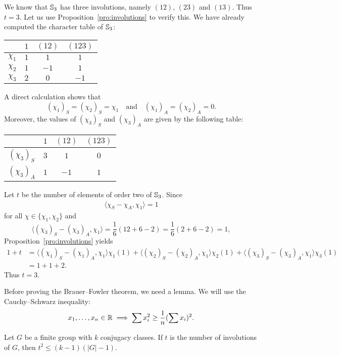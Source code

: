 \begin{example}
    We know that $\mathbb{S}_3$ has three involutions, namely $(12)$, $(23)$ and $(13)$. Thus $t=3$. 
    Let us use Proposition~\ref{pro:involutions} to verify this. 
    We have already computed the  character table
    of $\mathbb{S}_3$: 
\bigskip 
    \begin{center}
		\begin{tabular}{|c|ccc|}
			\hline
			& $1$ & $(12)$ & $(123)$ \tabularnewline
			\hline 
			$\chi_{1}$ & $1$ & $1$ & $1$\tabularnewline
			$\chi_{2}$ & $1$ & $-1$ & $1$ \tabularnewline
			$\chi_{3}$ & $2$ & $0$ & $-1$ \tabularnewline
			\hline
		\end{tabular}
	\end{center}
\bigskip 
A direct calculation shows that 
\[
(\chi_1)_S=(\chi_2)_S=\chi_1\quad\text{and}
\quad (\chi_1)_A=(\chi_2)_A=0.
\]
Moreover, the values of $(\chi_3)_S$ and $(\chi_3)_A$ 
are
given by the following table: 
\bigskip 
    \begin{center}
		\begin{tabular}{|c|ccc|}
			\hline
			& $1$ & $(12)$ & $(123)$ \tabularnewline
			\hline 
			$(\chi_{3})_S$ & $3$ & $1$ & $0$ \tabularnewline
			$(\chi_{3})_A$ & $1$ & $-1$ & $1$ \tabularnewline
			\hline
		\end{tabular}
	\end{center}
\bigskip 
Let $t$ be the number of elements 
of order two of $\mathbb{S}_3$. 
Since 
\begin{align*}
\langle\chi_S-\chi_A,\chi_1\rangle=1
\end{align*}
for all $\chi\in\{\chi_1,\chi_2\}$ and
\[
\langle (\chi_3)_S-(\chi_3)_A,\chi_1\rangle
=\frac{1}{6}(12+6-2)=\frac16(2+6-2)=1,
\]
Proposition~\ref{pro:involutions} yields 
\begin{align*} 
1+t&=\langle (\chi_1)_S-(\chi_1)_A,\chi_1\rangle\chi_1(1)
+\langle (\chi_2)_S-(\chi_2)_A,\chi_1\rangle\chi_2(1)
+\langle (\chi_3)_S-(\chi_3)_A,\chi_1\rangle\chi_3(1)\\
&=1+1+2.
\end{align*}
Thus $t=3$. 
\end{example}

Before proving the Brauer--Fowler theorem, we
need a lemma. We will use the Cauchy--Schwarz inequality: 
\[
x_1,\dots,x_n\in\mathbb{R}\implies
\sum x_i^2\geq\frac{1}{n}(\sum x_i)^2.
\]

\begin{lemma}
    Let $G$ be a finite group with $k$ conjugacy classes. 
    If $t$ is the number of involutions of $G$, then
    $t^2\leq (k-1)(|G|-1)$. 
\end{lemma}

